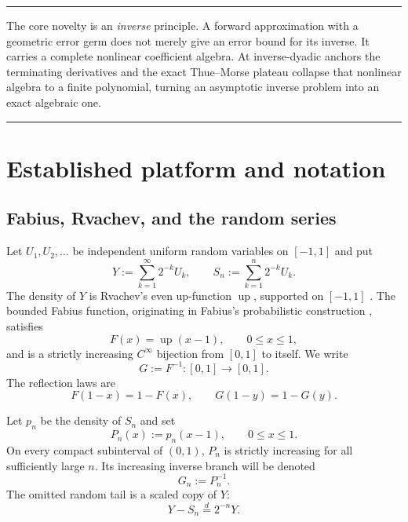 \documentclass[11pt,oneside]{article}
\numberwithin{equation}{section}
\theoremstyle{definition}
\theoremstyle{remark}
\newcommand{\Up}{\operatorname{up}}
\newcommand{\InvF}{G}
\newcommand{\Fn}{P_n}
\newcommand{\Gn}{G_n}
\newenvironment{boxedremark}{%
  \par\smallskip\noindent\begin{center}\begin{minipage}{0.94\textwidth}%
  \color{black}\hrule\vspace{0.6em}\small
}{%
  \vspace{0.6em}\hrule\end{minipage}\end{center}\smallskip
}
\begin{document}
\begin{boxedremark}
The core novelty is an \emph{inverse} principle.  A forward approximation with a geometric
error germ does not merely give an error bound for its inverse.  It carries a complete
nonlinear coefficient algebra.  At inverse-dyadic anchors the terminating derivatives and
the exact Thue--Morse plateau collapse that nonlinear algebra to a finite polynomial, turning
an asymptotic inverse problem into an exact algebraic one.
\end{boxedremark}

\section{Established platform and notation}
\label{p1:sec:platform}

\subsection{Fabius, Rvachev, and the random series}

Let $U_1,U_2,\ldots$ be independent uniform random variables on $[-1,1]$ and put
\begin{equation}
 Y:=\sum_{k=1}^{\infty}2^{-k}U_k,
 \qquad
 S_n:=\sum_{k=1}^{n}2^{-k}U_k.
 \label{p1:eq:Y-prefix}
\end{equation}
The density of $Y$ is Rvachev's even up-function $\Up$, supported on $[-1,1]$ \cite{p1:Rvachev1990,p1:Arias1982,p1:ProveItPrimary}.
The bounded Fabius function, originating in Fabius's probabilistic construction \cite{p1:Fabius1966}, satisfies
\begin{equation}
 F(x)=\Up(x-1),\qquad 0\le x\le1,
 \label{p1:eq:F-up-shift}
\end{equation}
and is a strictly increasing $C^\infty$ bijection from $[0,1]$ to itself.  We write
\begin{equation}
 \InvF:=F^{-1}:[0,1]\longrightarrow[0,1].
 \label{p1:eq:G-def}
\end{equation}
The reflection laws are
\begin{equation}
 F(1-x)=1-F(x),\qquad \InvF(1-y)=1-\InvF(y).
 \label{p1:eq:reflection}
\end{equation}

Let $p_n$ be the density of $S_n$ and set
\begin{equation}
 \Fn(x):=p_n(x-1),\qquad 0\le x\le1.
 \label{p1:eq:Pn-def}
\end{equation}
On every compact subinterval of $(0,1)$, $\Fn$ is strictly increasing for all sufficiently
large $n$.  Its increasing inverse branch will be denoted
\begin{equation}
 \Gn:=\Fn^{-1}.
 \label{p1:eq:Gn-def}
\end{equation}
The omitted random tail is a scaled copy of $Y$:
\begin{equation}
 Y-S_n\stackrel{d}=2^{-n}Y.
 \label{p1:eq:tail-copy}
\end{equation}
\end{document}
